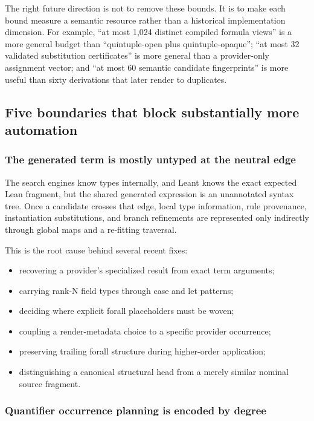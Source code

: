 \documentclass[11pt]{article}
\newcommand{\Leant}{\textsf{Leant}}
\begin{document}
The right future direction is not to remove these bounds.  It is to make each
bound measure a semantic resource rather than a historical implementation
dimension.  For example, ``at most 1,024 distinct compiled formula views'' is a
more general budget than ``quintuple-open plus quintuple-opaque''; ``at most 32
validated substitution certificates'' is more general than a provider-only
assignment vector; and ``at most 60 semantic candidate fingerprints'' is more
useful than sixty derivations that later render to duplicates.

\subsection{Five boundaries that block substantially more automation}

\subsubsection{The generated term is mostly untyped at the neutral edge}

The search engines know types internally, and \Leant{} knows the exact expected
Lean fragment, but the shared generated expression is an unannotated syntax
tree.  Once a candidate crosses that edge, local type information, rule
provenance, instantiation substitutions, and branch refinements are represented
only indirectly through global maps and a re-fitting traversal.

This is the root cause behind several recent fixes:

\begin{itemize}
  \item recovering a provider's specialized result from exact term arguments;
  \item carrying rank-N field types through case and let patterns;
  \item deciding where explicit forall placeholders must be woven;
  \item coupling a render-metadata choice to a specific provider occurrence;
  \item preserving trailing forall structure during higher-order application;
  \item distinguishing a canonical structural head from a merely similar
    nominal source fragment.
\end{itemize}

\subsubsection{Quantifier occurrence planning is encoded by degree}
\end{document}
